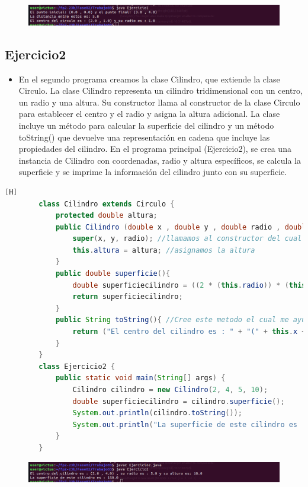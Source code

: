 \documentclass{article}
\begin{document}
	\begin{figure}[H]
		\centering
		\includegraphics[width=1.0\textwidth,keepaspectratio]{img/Captura.png}
	\end{figure}
	\subsection{Ejercicio2}
	\begin{itemize}	
		\item En el segundo programa creamos la clase Cilindro, que extiende la clase Circulo. La clase Cilindro representa un cilindro tridimensional con un centro, un radio y una altura. Su constructor llama al constructor de la clase Circulo para establecer el centro y el radio y asigna la altura adicional. La clase incluye un método para calcular la superficie del cilindro y un método toString() que devuelve una representación en cadena que incluye las propiedades del cilindro. En el programa principal (Ejercicio2), se crea una instancia de Cilindro con coordenadas, radio y altura específicos, se calcula la superficie y se imprime la información del cilindro junto con su superficie. 
	\end{itemize}	
	\begin{lstlisting}[language=java,caption={Las lineas de codigos del metodo creado:}][H]
		class Cilindro extends Circulo {
			protected double altura;
			public Cilindro (double x , double y , double radio , double altura){ //Creamos este constructor el cual nos va a establecer las coordenadas que necesitamos como su centro , radio y la longitud de este cilindro
				super(x, y, radio); //llamamos al constructor del cual heredamos esta clase que es Circulo lo cual nos ayudara en nuestra clase Cilindro para tener un centro y un radio definido
				this.altura = altura; //asignamos la altura 
			}
			public double superficie(){
				double superficiecilindro = ((2 * (this.radio)) * (this.altura + this.radio)); 
				return superficiecilindro;
			}
			public String toString(){ //Cree este metodo el cual me ayuda a de
				return ("El centro del cilindro es : " + "(" + this.x + " , " + this.y + ")" + " , su radio es : " + this.radio + " y su altura es: " + this.altura);
			}
		}
		class Ejercicio2 {
			public static void main(String[] args) {
				Cilindro cilindro = new Cilindro(2, 4, 5, 10);
				double superficiecilindro = cilindro.superficie();
				System.out.println(cilindro.toString());
				System.out.println("La superficie de este cilindro es : " + superficiecilindro);
			}
		}
	\end{lstlisting}
	\begin{figure}[H]
		\centering
		\includegraphics[width=1.0\textwidth,keepaspectratio]{img/Captura2.png}
	\end{figure}
\end{document}
